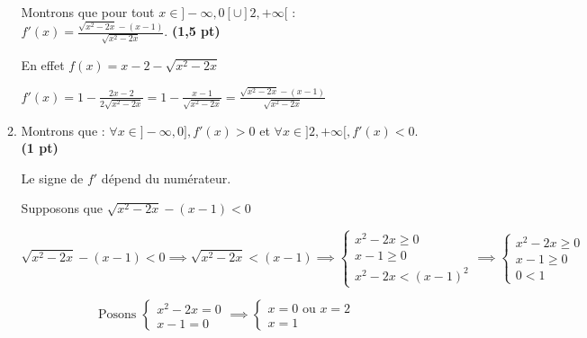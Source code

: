 \documentclass[12pt,a4paper]{article}
\begin{document}
\begin{enumerate}
\begin{enumerate}
Montrons que pour tout \( x \in ]-\infty, 0[ \cup ]2, +\infty[ \) :
    \(
    f'(x) = \frac{\sqrt{x^2 - 2x} - (x - 1)}{\sqrt{x^2 - 2x}}.
    \)    \hspace{1cm} \textbf{(1,5 pt)}
    
En effet $f(x)=x - 2 - \sqrt{x^2 - 2x}$

$f'(x)=1 - \frac{2x-2}{2\sqrt{x^2 - 2x}}=1 - \frac{x-1}{\sqrt{x^2 - 2x}}=\frac{\sqrt{x^2 - 2x}-(x-1)}{\sqrt{x^2 - 2x}}$
\item Montrons que : \( \forall x \in ]-\infty, 0], f'(x) > 0 \) et \( \forall x \in ]2, +\infty[, f'(x) < 0 \). \hspace{1cm} \textbf{(1 pt)}

Le signe de $f'$ dépend du numérateur.

Supposons que $\sqrt{x^2 - 2x} - (x - 1) <0 $

$$
\sqrt{x^2 - 2x} - (x - 1) <0 \implies \sqrt{x^2 - 2x} < (x - 1) \implies 
\begin{cases}
x^2 - 2x\geq 0 \\
x - 1 \geq 0 \\
x^2 - 2x < (x - 1)^{2}
\end{cases}
\implies 
\begin{cases}
x^2 - 2x\geq 0 \\
x - 1 \geq 0 \\
0 < 1
\end{cases}
$$

$$
\text{Posons }
\begin{cases}
x^2 - 2x = 0 \\
x - 1 = 0
\end{cases}
\implies
\begin{cases}
x=0 \text{ ou } x=2 \\
x = 1
\end{cases} 
$$

\begin{center}
\end{center}
\begin{center}



\end{center}
\end{enumerate}
\end{enumerate}
\end{document}
